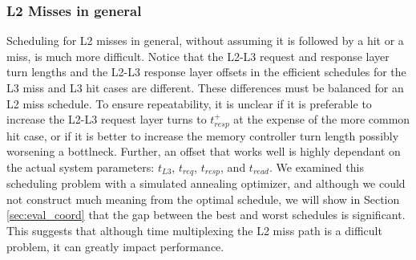\subsubsection{L2 Misses in general}
Scheduling for L2 misses in general, without assuming it is followed by a hit 
or a miss, is much more difficult. Notice that the L2-L3 request and response 
layer turn lengths and the L2-L3 response layer offsets in the efficient 
schedules for the L3 miss and L3 hit cases are different. These differences 
must be balanced for an L2 miss schedule. To ensure repeatability, it is 
unclear if it is preferable to increase the L2-L3 request layer turns to 
$t_{resp}^+$ at the expense of the more common hit case, or if it is better to 
increase the memory controller turn length possibly worsening a bottlneck.
Further, an offset that works well is highly dependant on the actual system 
parameters: $t_{L3}$, $t_{req}$, $t_{resp}$, and $t_{read}$.
We examined this scheduling problem with a simulated annealing optimizer,
and although we could not construct much meaning from the optimal 
schedule, we will show in Section \ref{sec:eval_coord} that the gap between
the best and worst schedules is significant. This suggests that although time 
multiplexing the L2 miss path is a difficult problem, it can greatly impact 
performance.
